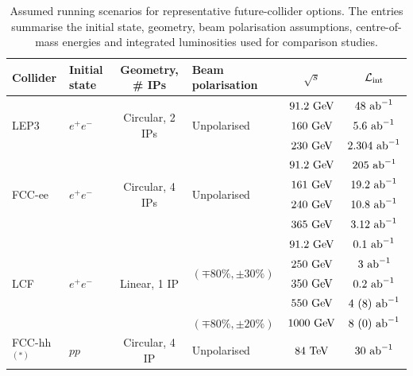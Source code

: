 \documentclass[11pt,a4paper]{report}
\begin{document}
\begin{table}[t]
\centering
\small
\setlength{\tabcolsep}{5pt}
\renewcommand{\arraystretch}{1.25}
\caption{Assumed running scenarios for representative future-collider options. 
The entries summarise the initial state, geometry, beam polarisation assumptions, 
centre-of-mass energies and integrated luminosities used for comparison studies.}

\label{tab:future-collider-options}

\begin{tabular}{llclcc}
\toprule
\textbf{Collider} &
\textbf{Initial state} &
\textbf{Geometry, \# IPs} &
\textbf{Beam polarisation} &
\textbf{$\sqrt{s}$} &
\textbf{$\mathcal{L}_{\rm int}$} \\
\midrule
		
\multirow{3}{*}{LEP3}
& \multirow{3}{*}{$e^+e^-$}
& \multirow{3}{*}{Circular, 2 IPs}
& \multirow{3}{*}{Unpolarised}
& $91.2~{\rm GeV}$  & $48~{\rm ab}^{-1}$ \\
& & & & $160~{\rm GeV}$ & $5.6~{\rm ab}^{-1}$ \\
& & & & $230~{\rm GeV}$ & $2.304~{\rm ab}^{-1}$ \\
		
\midrule
		
\multirow{4}{*}{FCC-ee}
& \multirow{4}{*}{$e^+e^-$}
& \multirow{4}{*}{Circular, 4 IPs}
& \multirow{4}{*}{Unpolarised}
& $91.2~{\rm GeV}$ & $205~{\rm ab}^{-1}$ \\
& & & & $161~{\rm GeV}$  & $19.2~{\rm ab}^{-1}$ \\
& & & & $240~{\rm GeV}$  & $10.8~{\rm ab}^{-1}$ \\
& & & & $365~{\rm GeV}$  & $3.12~{\rm ab}^{-1}$ \\
		
\midrule
		
\multirow{5}{*}{LCF}
& \multirow{5}{*}{$e^+e^-$}
& \multirow{5}{*}{Linear, 1 IP}
& \multirow{4}{*}{$(\mp80\%, \pm30\%)$}
& $91.2~{\rm GeV}$  & $0.1~{\rm ab}^{-1}$ \\
& & & & $250~{\rm GeV}$  & $3~{\rm ab}^{-1}$ \\
& & & & $350~{\rm GeV}$  & $0.2~{\rm ab}^{-1}$ \\
& & & & $550~{\rm GeV}$  & $4~(8)~{\rm ab}^{-1}$ \\
& & & $(\mp80\%, \pm20\%)$
& $1000~{\rm GeV}$ & $8~(0)~{\rm ab}^{-1}$ \\
		
\midrule
		
FCC-hh$^{(*)}$
& $pp$
& Circular, 4 IP
& Unpolarised
& $84~{\rm TeV}$
& $30~{\rm ab}^{-1}$ \\
		

\end{tabular}
\end{table}
\end{document}
